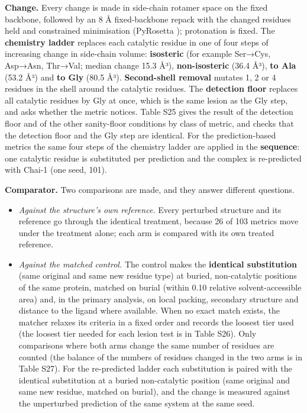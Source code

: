 \documentclass[
  10pt,
]{article}
\providecommand{\tightlist}{%
  \setlength{\itemsep}{0pt}\setlength{\parskip}{0pt}}
\DeclareRobustCommand{\_}{\textunderscore\hspace{0pt}}
\begin{document}
\textbf{Change.}
Every change is made
in side-chain
rotamer space on the
fixed backbone,
followed by an 8 Å
fixed-backbone
repack with the
changed residues
held and constrained
minimisation
(PyRosetta
\cite{chaudhury2010});
protonation is
fixed. The
\textbf{chemistry
ladder} replaces
each catalytic
residue in one of
four steps of
increasing change in
side-chain volume:
\textbf{isosteric}
(for example
Ser→Cys, Asp→Asn,
Thr→Val; median
change 15.3 Å³),
\textbf{non-isosteric}
(36.4 Å³),
\textbf{to Ala}
(53.2 Å³) and
\textbf{to Gly}
(80.5 Å³).
\textbf{Second-shell
removal} mutates 1,
2 or 4 residues in
the shell around the
catalytic residues.
The
\textbf{detection
floor} replaces all
catalytic residues
by Gly at once,
which is the same
lesion as the Gly
step, and asks
whether the metric
notices. Table S25
gives the result of
the detection floor
and of the other
sanity-floor
conditions by class
of metric, and
checks that the
detection floor and
the Gly step are
identical. For the
prediction-based
metrics the same
four steps of the
chemistry ladder are
applied in the
\textbf{sequence}:
one catalytic
residue is
substituted per
prediction and the
complex is
re-predicted with
Chai-1
\cite{chai2024} (one
seed, 101).

\textbf{Comparator.}
Two comparisons are
made, and they
answer different
questions.

\begin{itemize}
\tightlist
\item
  \emph{Against the
  structure's own
  reference.} Every
  perturbed
  structure and its
  reference go
  through the
  identical
  treatment, because
  26 of 103 metrics
  move under the
  treatment alone;
  each arm is
  compared with its
  own treated
  reference.
\item
  \emph{Against the
  matched control.}
  The control makes
  the
  \textbf{identical
  substitution}
  (same original and
  same new residue
  type) at buried,
  non-catalytic
  positions of the
  same protein,
  matched on burial
  (within 0.10
  relative
  solvent-accessible
  area) and, in the
  primary analysis,
  on local packing,
  secondary
  structure and
  distance to the
  ligand where
  available. When no
  exact match
  exists, the
  matcher relaxes
  its criteria in a
  fixed order and
  records the
  loosest tier used
  (the loosest tier
  needed for each
  lesion test is in
  Table S26). Only
  comparisons where
  both arms change
  the same number of
  residues are
  counted (the
  balance of the
  numbers of
  residues changed
  in the two arms is
  in Table S27). For
  the re-predicted
  ladder each
  substitution is
  paired with the
  identical
  substitution at a
  buried
  non-catalytic
  position (same
  original and same
  new residue,
  matched on
  burial), and the
  change is measured
  against the
  unperturbed
  prediction of the
  same system at the
  same seed.
\end{itemize}
\end{document}
